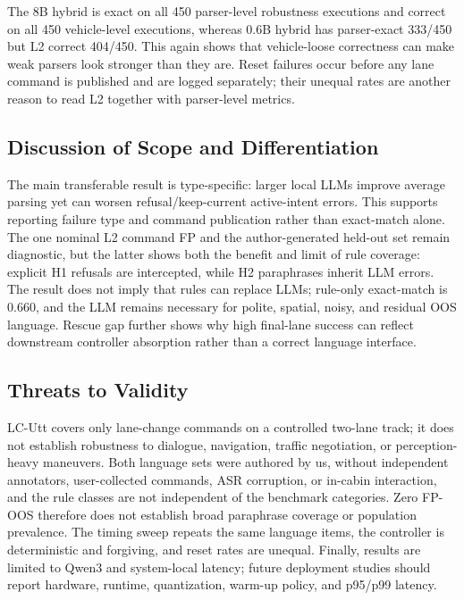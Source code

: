 \documentclass[conference]{IEEEtran}
\begin{document}


The 8B hybrid is exact on all 450 parser-level robustness executions and correct on all 450 vehicle-level executions, whereas 0.6B hybrid has parser-exact 333/450 but L2 correct 404/450. This again shows that vehicle-loose correctness can make weak parsers look stronger than they are. Reset failures occur before any lane command is published and are logged separately; their unequal rates are another reason to read L2 together with parser-level metrics.



\subsection{Discussion of Scope and Differentiation}
The main transferable result is type-specific: larger local LLMs improve average parsing yet can worsen refusal/keep-current active-intent errors. This supports reporting failure type and command publication rather than exact-match alone. The one nominal L2 command FP and the author-generated held-out set remain diagnostic, but the latter shows both the benefit and limit of rule coverage: explicit H1 refusals are intercepted, while H2 paraphrases inherit LLM errors. The result does not imply that rules can replace LLMs; rule-only exact-match is 0.660, and the LLM remains necessary for polite, spatial, noisy, and residual OOS language. Rescue gap further shows why high final-lane success can reflect downstream controller absorption rather than a correct language interface.

\subsection{Threats to Validity}
LC-Utt covers only lane-change commands on a controlled two-lane track; it does not establish robustness to dialogue, navigation, traffic negotiation, or perception-heavy maneuvers. Both language sets were authored by us, without independent annotators, user-collected commands, ASR corruption, or in-cabin interaction, and the rule classes are not independent of the benchmark categories. Zero FP-OOS therefore does not establish broad paraphrase coverage or population prevalence. The timing sweep repeats the same language items, the controller is deterministic and forgiving, and reset rates are unequal. Finally, results are limited to Qwen3 and system-local latency; future deployment studies should report hardware, runtime, quantization, warm-up policy, and p95/p99 latency.
\end{document}
